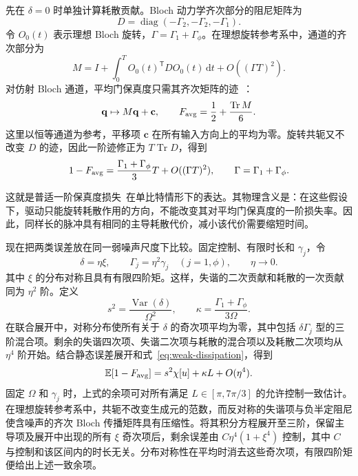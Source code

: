 \documentclass[12pt]{iopjournal}
\theoremstyle{definition}
\newcommand{\dd}{\mathrm{d}}
\begin{document}
先在 $\delta=0$ 时单独计算耗散贡献。Bloch 动力学齐次部分的阻尼矩阵为
\begin{equation*}
 D=\operatorname{diag}(-\Gamma_2,-\Gamma_2,-\Gamma_1).
\end{equation*}
令 $O_0(t)$ 表示理想 Bloch 旋转，$\Gamma=\Gamma_1+\Gamma_\phi$。在理想旋转参考系中，通道的齐次部分为
\begin{equation*}
 M=I+\int_0^T O_0(t)^{\mathsf T}D O_0(t)\,\dd t
       +O((\Gamma T)^2).
\end{equation*}
对仿射 Bloch 通道，平均门保真度只需其齐次矩阵的迹~\cite{bowdrey2002,nielsen2002}：
\begin{equation*}
 \mathbf q\mapsto M\mathbf q+\mathbf c,
 \qquad F_{\rm avg}=\frac12+\frac{\operatorname{Tr}M}{6}.
\end{equation*}
这里以恒等通道为参考，平移项 $\mathbf c$ 在所有输入方向上的平均为零。旋转共轭又不改变 $D$ 的迹，因此一阶迹修正为 $T\operatorname{Tr}D$，得到
\begin{equation}
 1-F_{\rm avg}
 =\frac{\Gamma_1+\Gamma_\phi}{3}T+O((\Gamma T)^2),
 \qquad\Gamma=\Gamma_1+\Gamma_\phi.
 \label{eq:weak-dissipation}
\end{equation}



这就是普适一阶保真度损失~\cite{abad2022}在单比特情形下的表达。其物理含义是：在这些假设下，驱动只能旋转耗散作用的方向，不能改变其对平均门保真度的一阶损失率。因此，同样长的脉冲具有相同的主导耗散代价，减小该代价需要缩短时间。

现在把两类误差放在同一弱噪声尺度下比较。固定控制、有限时长和 $\gamma_j$，令
\begin{equation*}
 \delta=\eta\xi,\qquad
 \Gamma_j=\eta^2\gamma_j\quad(j=1,\phi),\qquad \eta\to0.
\end{equation*}
其中 $\xi$ 的分布对称且具有有限四阶矩。这样，失谐的二次贡献和耗散的一次贡献同为 $\eta^2$ 阶。定义
\begin{equation}
 s^2=\frac{\operatorname{Var}(\delta)}{\Omega^2},
 \qquad
 \kappa=\frac{\Gamma_1+\Gamma_\phi}{3\Omega}.
 \label{eq:noise-parameters}
\end{equation}
在联合展开中，对称分布使所有关于 $\delta$ 的奇次项平均为零，其中包括 $\delta\Gamma_j$ 型的三阶混合项。剩余的失谐四次项、失谐二次项与耗散的混合项以及耗散二次项均从 $\eta^4$ 阶开始。结合静态误差展开和式~\eqref{eq:weak-dissipation}，得到
\begin{equation}
 \mathbb E[1-F_{\rm avg}]
 =s^2\chi[u]+\kappa L+O(\eta^4).
 \label{eq:combined-expansion}
\end{equation}
固定 $\Omega$ 和 $\gamma_j$ 时，上式的余项可对所有满足 $L\in[\pi,7\pi/3]$ 的允许控制一致估计。在理想旋转参考系中，共轭不改变生成元的范数，而反对称的失谐项与负半定阻尼使含噪声的齐次 Bloch 传播矩阵具有压缩性。将其积分方程展开至三阶，保留主导项及展开中出现的所有 $\xi$ 奇次项后，剩余误差由 $C\eta^4(1+\xi^4)$ 控制，其中 $C$ 与控制和该区间内的时长无关。分布对称性在平均时消去这些奇次项，有限四阶矩便给出上述一致余项。
\end{document}

